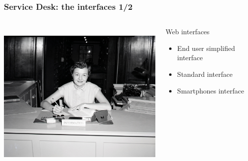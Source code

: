 \documentclass{beamer}
\begin{document}
\begin{frame}

    \frametitle{Service Desk: the interfaces 1/2}

 \begin{columns}
 \begin{column}{0.45\textwidth}
         \includegraphics[height=7.5cm]{./pics/servicedesk2.jpg}
 \end{column}
 \begin{column}{0.45\textwidth}
     \begin{block}{Web interfaces}
        \begin{itemize}
            \item End user simplified interface
            \item Standard interface
            \item Smartphones interface
        \end{itemize}
    \end{block}
  
 \end{column}
\end{columns}






\end{frame}
\end{document}
